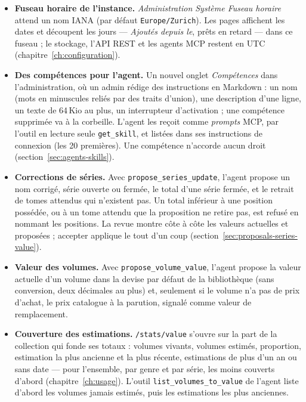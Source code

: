 \begin{itemize}
  \item \textbf{Fuseau horaire de l'instance.} \emph{Administration
        \textrightarrow{} Système \textrightarrow{} Fuseau horaire}
        attend un nom IANA (par défaut \texttt{Europe/Zurich}). Les pages
        affichent les dates et découpent les jours --- \emph{Ajoutés
        depuis le}, prêts en retard --- dans ce fuseau ; le stockage, l'API
        REST et les agents MCP restent en UTC
        (chapitre~\ref{ch:configuration}).
  \item \textbf{Des compétences pour l'agent.} Un nouvel onglet
        \emph{Compétences} dans l'administration, où un admin rédige des
        instructions en Markdown : un nom (mots en minuscules reliés par
        des traits d'union), une description d'une ligne, un texte de
        64\,Kio au plus, un interrupteur d'activation ; une compétence
        supprimée va à la corbeille. L'agent les reçoit comme
        \emph{prompts} MCP, par l'outil en lecture seule
        \texttt{get\_skill}, et listées dans ses instructions de connexion
        (les 20 premières). Une compétence n'accorde aucun droit
        (section~\ref{sec:agents-skills}).
  \item \textbf{Corrections de séries.} Avec
        \texttt{propose\_series\_update}, l'agent propose un nom corrigé,
        série ouverte ou fermée, le total d'une série fermée, et le
        retrait de tomes attendus qui n'existent pas. Un total inférieur
        à une position possédée, ou à un tome attendu que la proposition
        ne retire pas, est refusé en nommant les positions. La revue
        montre côte à côte les valeurs actuelles et proposées ; accepter
        applique le tout d'un coup
        (section~\ref{sec:proposals-series-value}).
  \item \textbf{Valeur des volumes.} Avec
        \texttt{propose\_volume\_value}, l'agent propose la valeur
        actuelle d'un volume dans la devise par défaut de la
        bibliothèque (sans conversion, deux décimales au plus) et,
        seulement si le volume n'a pas de prix d'achat, le prix
        catalogue à la parution, signalé comme valeur de remplacement.
  \item \textbf{Couverture des estimations.} \texttt{/stats/value}
        s'ouvre sur la part de la collection qui fonde ses totaux :
        volumes vivants, volumes estimés, proportion, estimation la plus
        ancienne et la plus récente, estimations de plus d'un an ou sans
        date --- pour l'ensemble, par genre et par série, les moins
        couverts d'abord (chapitre~\ref{ch:usage}). L'outil
        \texttt{list\_volumes\_to\_value} de l'agent liste d'abord les
        volumes jamais estimés, puis les estimations les plus anciennes.
\end{itemize}

